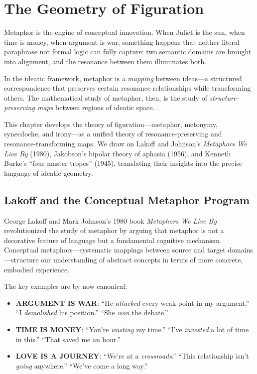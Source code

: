 \section{The Geometry of Figuration}

Metaphor is the engine of conceptual innovation.  When Juliet is the sun,
when time is money, when argument is war, something happens that neither literal
paraphrase nor formal logic can fully capture: two semantic domains are brought
into alignment, and the resonance between them illuminates both.

In the ideatic framework, metaphor is a \emph{mapping} between ideas---a
structured correspondence that preserves certain resonance relationships while
transforming others.  The mathematical study of metaphor, then, is the study of
\emph{structure-preserving maps} between regions of ideatic space.

This chapter develops the theory of figuration---metaphor, metonymy, synecdoche,
and irony---as a unified theory of resonance-preserving and resonance-transforming
maps.  We draw on Lakoff and Johnson's \emph{Metaphors We Live By} (1980),
Jakobson's bipolar theory of aphasia (1956), and Kenneth Burke's ``four master
tropes'' (1945), translating their insights into the precise language of ideatic
geometry.


\subsection{Lakoff and the Conceptual Metaphor Program}

George Lakoff and Mark Johnson's 1980 book \emph{Metaphors We Live By}
revolutionized the study of metaphor by arguing that metaphor is not a
decorative feature of language but a fundamental cognitive mechanism.
Conceptual metaphors---systematic mappings between source and target
domains---structure our understanding of abstract concepts in terms of more
concrete, embodied experience.

The key examples are by now canonical:
\begin{itemize}
\item \textbf{ARGUMENT IS WAR}: ``He \emph{attacked} every weak point in my
argument.'' ``I \emph{demolished} his position.'' ``She \emph{won} the debate.''
\item \textbf{TIME IS MONEY}: ``You're \emph{wasting} my time.'' ``I've
\emph{invested} a lot of time in this.'' ``That saved me an hour.''
\item \textbf{LOVE IS A JOURNEY}: ``We're at a \emph{crossroads}.'' ``This
relationship isn't \emph{going} anywhere.'' ``We've come a long way.''
\end{itemize}

